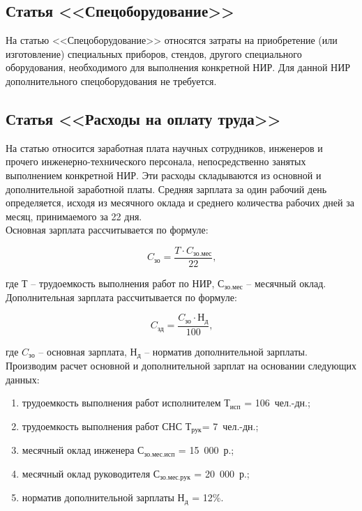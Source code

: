 \subsection{Статья <<Спецоборудование>>}

На статью <<Спецоборудование>> относятся затраты на приобретение (или изготовление) специальных приборов,
стендов, другого специального оборудования, необходимого для выполнения конкретной НИР.
Для данной НИР дополнительного спецоборудования не требуется.

\subsection{Статья <<Расходы на оплату труда>>}

На статью относится заработная плата научных сотрудников, инженеров и прочего инженерно-технического персонала,
непосредственно занятых выполнением конкретной НИР. Эти расходы складываются из основной и дополнительной
заработной платы. Средняя зарплата за один рабочий день определяется, исходя из месячного оклада и среднего
количества рабочих дней за месяц, принимаемого за 22 дня.\\
Основная зарплата рассчитывается по формуле:

\begin{equation}
C_{зо} = \frac{T \cdot C_{зо.мес}}{22}\mbox{,}
\label{F:F1}
\end{equation}

где Т – трудоемкость выполнения работ по НИР, $С_{зо.мес}$ – месячный оклад.\\
Дополнительная зарплата рассчитывается по формуле:

\begin{equation}
C_{зд} = \frac{C_{зо} \cdot Н_{д}}{100}\mbox{,}
\label{F:F2}
\end{equation}

где $C_{зо}$ – основная зарплата, $Н_{д}$ – норматив дополнительной зарплаты.\\
Производим расчет основной и дополнительной зарплат на основании следующих данных:

\begin{enumerate}
\item трудоемкость выполнения работ исполнителем $Т_{исп}$ = 106~чел.-дн.;
\item трудоемкость выполнения работ СНС $Т_{рук}$= 7~чел.-дн.;
\item месячный оклад инженера $С_{зо.мес.исп}$ = 15~000~р.;
\item месячный оклад руководителя $С_{зо.мес.рук}$ = 20~000~р.;
\item норматив дополнительной зарплаты $Н_{д}$ = 12\%.
\end{enumerate}

